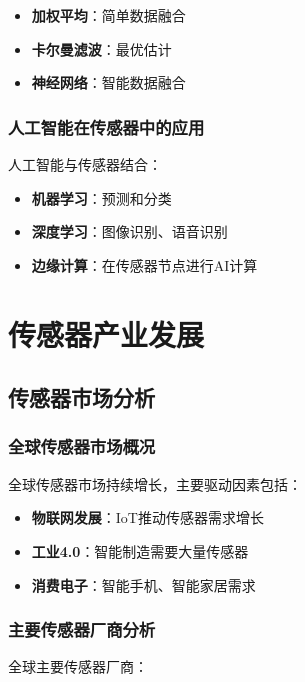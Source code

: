 \documentclass[12pt,UTF8]{ctexbook}
\begin{document}
\begin{itemize}[leftmargin=2cm]
	\item \textbf{加权平均}：简单数据融合
	\item \textbf{卡尔曼滤波}：最优估计
	\item \textbf{神经网络}：智能数据融合
\end{itemize}

\section{人工智能在传感器中的应用}

人工智能与传感器结合：

\begin{itemize}[leftmargin=2cm]
	\item \textbf{机器学习}：预测和分类
	\item \textbf{深度学习}：图像识别、语音识别
	\item \textbf{边缘计算}：在传感器节点进行AI计算
\end{itemize}

\part{传感器产业发展}

\chapter{传感器市场分析}

\section{全球传感器市场概况}

全球传感器市场持续增长，主要驱动因素包括：

\begin{itemize}[leftmargin=2cm]
	\item \textbf{物联网发展}：IoT推动传感器需求增长
	\item \textbf{工业4.0}：智能制造需要大量传感器
	\item \textbf{消费电子}：智能手机、智能家居需求
\end{itemize}

\section{主要传感器厂商分析}

全球主要传感器厂商：
\end{document}
